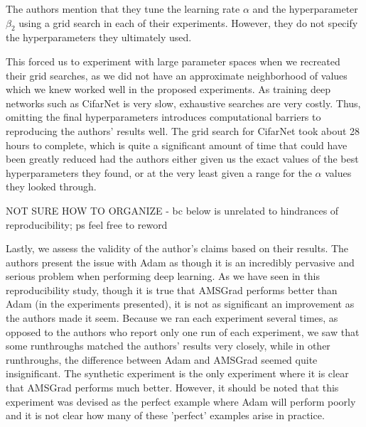 \documentclass[letterpaper, 10 pt, conference]{ieeeconf}  %
\begin{document}
The authors mention that they tune the learning rate $\alpha$ and the hyperparameter $\beta_2$ using a grid search in each of their experiments. However, they do not specify the hyperparameters they ultimately used. 

This forced us to experiment with large parameter spaces when we recreated their grid searches, as we did not have an approximate neighborhood of values which we knew worked well in the proposed experiments. As training deep networks such as CifarNet is very slow, exhaustive searches are very costly. Thus, omitting the final hyperparameters introduces computational barriers to reproducing the authors' results well. The grid search for CifarNet took about 28 hours to complete, which is quite a significant amount of time that could have been greatly reduced had the authors either given us the exact values of the best hyperparameters they found, or at the very least given a range for the $\alpha$ values they looked through. 

NOT SURE HOW TO ORGANIZE - bc below is unrelated to hindrances of reproducibility; ps feel free to reword

Lastly, we assess the validity of the author's claims based on their results. The authors present the issue with Adam as though it is an incredibly pervasive and serious problem when performing deep learning. As we have seen in this reproducibility study, though it is true that AMSGrad performs better than Adam (in the experiments presented), it is not as significant an improvement as the authors made it seem. Because we ran each experiment several times, as opposed to the authors who report only one run of each experiment, we saw that some runthroughs matched the authors' results very closely, while in other runthroughs, the difference between Adam and AMSGrad seemed quite insignificant. The synthetic experiment is the only experiment where it is clear that AMSGrad performs much better. However, it should be noted that this experiment was devised as the perfect example where Adam will perform poorly and it is not clear how many of these 'perfect' examples arise in practice. 


 
\addtolength{\textheight}{-12cm}   %
\end{document}
